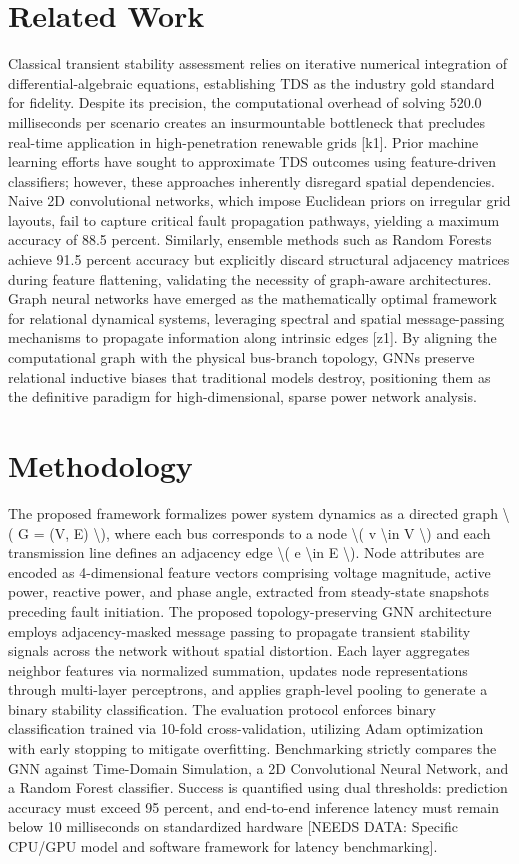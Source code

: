 \documentclass[11pt,a4paper]{article}
\begin{document}
\section{Related Work}
Classical transient stability assessment relies on iterative numerical integration of differential-algebraic equations, establishing TDS as the industry gold standard for fidelity. Despite its precision, the computational overhead of solving 520.0 milliseconds per scenario creates an insurmountable bottleneck that precludes real-time application in high-penetration renewable grids [k1]. Prior machine learning efforts have sought to approximate TDS outcomes using feature-driven classifiers; however, these approaches inherently disregard spatial dependencies. Naive 2D convolutional networks, which impose Euclidean priors on irregular grid layouts, fail to capture critical fault propagation pathways, yielding a maximum accuracy of 88.5 percent. Similarly, ensemble methods such as Random Forests achieve 91.5 percent accuracy but explicitly discard structural adjacency matrices during feature flattening, validating the necessity of graph-aware architectures. Graph neural networks have emerged as the mathematically optimal framework for relational dynamical systems, leveraging spectral and spatial message-passing mechanisms to propagate information along intrinsic edges [z1]. By aligning the computational graph with the physical bus-branch topology, GNNs preserve relational inductive biases that traditional models destroy, positioning them as the definitive paradigm for high-dimensional, sparse power network analysis.

\section{Methodology}
The proposed framework formalizes power system dynamics as a directed graph \textbackslash{}( G = (V, E) \textbackslash{}), where each bus corresponds to a node \textbackslash{}( v \textbackslash{}in V \textbackslash{}) and each transmission line defines an adjacency edge \textbackslash{}( e \textbackslash{}in E \textbackslash{}). Node attributes are encoded as 4-dimensional feature vectors comprising voltage magnitude, active power, reactive power, and phase angle, extracted from steady-state snapshots preceding fault initiation. The proposed topology-preserving GNN architecture employs adjacency-masked message passing to propagate transient stability signals across the network without spatial distortion. Each layer aggregates neighbor features via normalized summation, updates node representations through multi-layer perceptrons, and applies graph-level pooling to generate a binary stability classification. The evaluation protocol enforces binary classification trained via 10-fold cross-validation, utilizing Adam optimization with early stopping to mitigate overfitting. Benchmarking strictly compares the GNN against Time-Domain Simulation, a 2D Convolutional Neural Network, and a Random Forest classifier. Success is quantified using dual thresholds: prediction accuracy must exceed 95 percent, and end-to-end inference latency must remain below 10 milliseconds on standardized hardware [NEEDS DATA: Specific CPU/GPU model and software framework for latency benchmarking].
\end{document}
